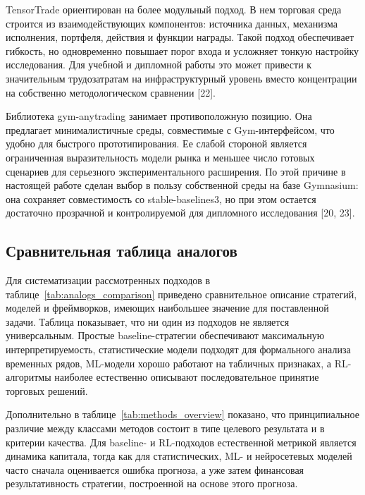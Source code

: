 TensorTrade ориентирован на более модульный подход. В нем торговая среда строится из взаимодействующих компонентов: источника данных, механизма исполнения, портфеля, действия и функции награды. Такой подход обеспечивает гибкость, но одновременно повышает порог входа и усложняет тонкую настройку исследования. Для учебной и дипломной работы это может привести к значительным трудозатратам на инфраструктурный уровень вместо концентрации на собственно методологическом сравнении [22].

Библиотека gym-anytrading занимает противоположную позицию. Она предлагает минималистичные среды, совместимые с Gym-интерфейсом, что удобно для быстрого прототипирования. Ее слабой стороной является ограниченная выразительность модели рынка и меньшее число готовых сценариев для серьезного экспериментального расширения. По этой причине в настоящей работе сделан выбор в пользу собственной среды на базе Gymnasium: она сохраняет совместимость со stable-baselines3, но при этом остается достаточно прозрачной и контролируемой для дипломного исследования [20, 23].

\subsection{Сравнительная таблица аналогов}

Для систематизации рассмотренных подходов в таблице~\ref{tab:analogs_comparison} приведено сравнительное описание стратегий, моделей и фреймворков, имеющих наибольшее значение для поставленной задачи. Таблица показывает, что ни один из подходов не является универсальным. Простые baseline-стратегии обеспечивают максимальную интерпретируемость, статистические модели подходят для формального анализа временных рядов, ML-модели хорошо работают на табличных признаках, а RL-алгоритмы наиболее естественно описывают последовательное принятие торговых решений.



Дополнительно в таблице~\ref{tab:methods_overview} показано, что принципиальное различие между классами методов состоит в типе целевого результата и в критерии качества. Для baseline- и RL-подходов естественной метрикой является динамика капитала, тогда как для статистических, ML- и нейросетевых моделей часто сначала оценивается ошибка прогноза, а уже затем финансовая результативность стратегии, построенной на основе этого прогноза.

\begin{table}[H]
\caption{Сопоставление классов методов, входов и критериев оценки}
\label{tab:methods_overview}

\end{table}

